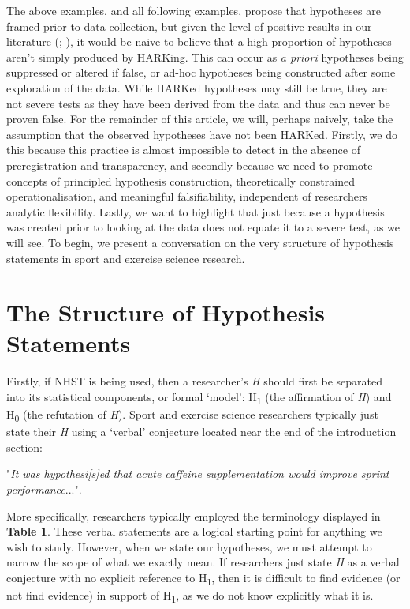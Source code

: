 \documentclass[
]{article}
\begin{document}
The above examples, and all following examples, propose that hypotheses
are framed prior to data collection, but given the level of positive
results in our literature (; ), it
would be naive to believe that a high proportion of hypotheses aren't
simply produced by HARKing. This can occur as \emph{a priori} hypotheses
being suppressed or altered if false, or ad-hoc hypotheses being
constructed after some exploration of the data. While HARKed hypotheses
may still be true, they are not severe tests as they have been derived
from the data and thus can never be proven false. For the remainder of
this article, we will, perhaps naively, take the assumption that the
observed hypotheses have not been HARKed. Firstly, we do this because
this practice is almost impossible to detect in the absence of
preregistration and transparency, and secondly because we need to
promote concepts of principled hypothesis construction, theoretically
constrained operationalisation, and meaningful falsifiability,
independent of researchers analytic flexibility. Lastly, we want to
highlight that just because a hypothesis was created prior to looking at
the data does not equate it to a severe test, as we will see. To begin,
we present a conversation on the very structure of hypothesis statements
in sport and exercise science research.

\section{The Structure of Hypothesis
Statements}\label{the-structure-of-hypothesis-statements}

Firstly, if NHST is being used, then a researcher's \emph{H} should
first be separated into its statistical components, or formal `model':
H\textsubscript{1} (the affirmation of \emph{H}) and H\textsubscript{0}
(the refutation of \emph{H}). Sport and exercise science researchers
typically just state their \emph{H} using a `verbal' conjecture located
near the end of the introduction section:

\begin{center}

"\textit{It was hypothesi[s]ed that acute caffeine supplementation would improve sprint performance}...".

\end{center}

More specifically, researchers typically employed the terminology
displayed in \textbf{Table 1}. These verbal statements are a logical
starting point for anything we wish to study. However, when we state our
hypotheses, we must attempt to narrow the scope of what we exactly mean.
If researchers just state \emph{H} as a verbal conjecture with no
explicit reference to H\textsubscript{1}, then it is difficult to find
evidence (or not find evidence) in support of H\textsubscript{1}, as we
do not know explicitly what it is.
\end{document}
